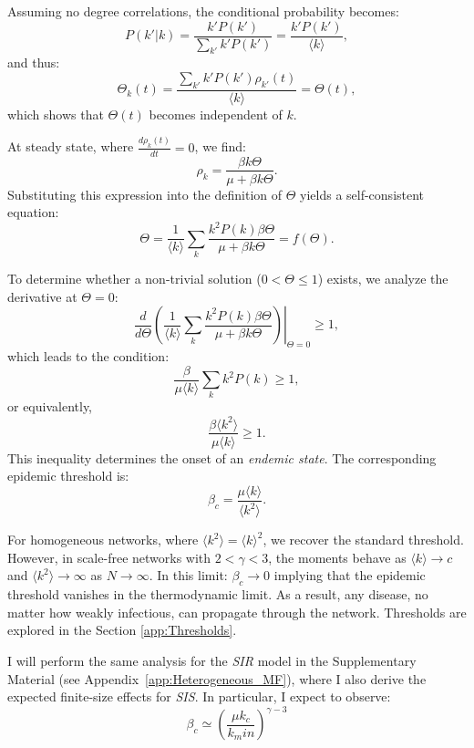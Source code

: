 Assuming no degree correlations, the conditional probability becomes:
\[
P(k'|k) = \frac{k' P(k')}{\sum_{k'} k' P(k')} = \frac{k' P(k')}{\langle k \rangle},
\]
and thus:
\[
\Theta_k(t) = \frac{\sum_{k'} k' P(k') \rho_{k'}(t)}{\langle k \rangle} = \Theta(t),
\]
which shows that \(\Theta(t)\) becomes independent of \(k\).

At steady state, where \(\frac{d\rho_k(t)}{dt} = 0\), we find:
\[
\rho_k = \frac{\beta k \Theta}{\mu + \beta k \Theta}.
\]
Substituting this expression into the definition of \(\Theta\) yields a self-consistent equation:
\[
\Theta = \frac{1}{\langle k \rangle} \sum_k \frac{k^2 P(k) \beta \Theta}{\mu + \beta k \Theta} = f(\Theta).
\]

To determine whether a non-trivial solution (\(0 < \Theta \leq 1\)) exists, we analyze the derivative at \(\Theta = 0\):
\[
\left. \frac{d}{d\Theta} \left( \frac{1}{\langle k \rangle} \sum_k \frac{k^2 P(k) \beta \Theta}{\mu + \beta k \Theta} \right) \right|_{\Theta = 0} \geq 1,
\]
which leads to the condition:
\[
\frac{\beta}{\mu \langle k \rangle} \sum_k k^2 P(k) \geq 1,
\]
or equivalently,
\[
\frac{\beta \langle k^2 \rangle}{\mu \langle k \rangle} \geq 1.
\]
This inequality determines the onset of an \textit{endemic state}. The corresponding epidemic threshold is:
\[
\beta_c = \frac{\mu \langle k \rangle}{\langle k^2 \rangle}.
\]

For homogeneous networks, where \(\langle k^2 \rangle = \langle k \rangle^2\), we recover the standard threshold. However, in scale-free networks with \(2 < \gamma < 3\), the moments behave as \(\langle k \rangle \rightarrow c\) and \(\langle k^2 \rangle \rightarrow \infty\) as \(N \rightarrow \infty\). In this limit:
$\beta_c \rightarrow 0$
implying that the epidemic threshold vanishes in the thermodynamic limit. As a result, any disease, no matter how weakly infectious, can propagate through the network. Thresholds are explored in the Section \ref{app:Thresholds}.

I will perform the same analysis for the \textit{SIR} model in the Supplementary Material (see Appendix~\ref{app:Heterogeneous_MF}), where I also derive the expected finite-size effects for \textit{SIS}. In particular, I expect to observe:
$$\beta_c \simeq \left(\frac{\mu k_c}{k_min}\right)^{\gamma-3}$$




\newpage